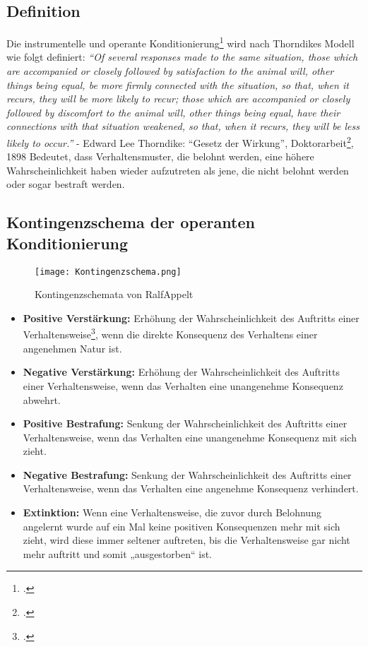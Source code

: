 \subsection{Definition}	
Die instrumentelle und operante Konditionierung\footcite{operant-conditioning2} wird nach Thorndikes Modell wie folgt definiert: 
\textit{“Of several responses made to the same situation, those which are accompanied or closely followed by satisfaction to the animal will, other things being equal, be more firmly connected with the situation, so that, when it recurs, they will be more likely to recur; those which are accompanied or closely followed by discomfort to the animal will, other things being equal, have their connections with that situation weakened, so that, when it recurs, they will be less likely to occur.”} 
- Edward Lee Thorndike: “Gesetz der Wirkung”, Doktorarbeit\footcite{operant-conditioning}, 1898 
Bedeutet, dass Verhaltensmuster, die belohnt werden, eine höhere Wahrscheinlichkeit haben wieder aufzutreten als jene, die nicht belohnt werden oder sogar bestraft werden. 
\subsection{Kontingenzschema der operanten Konditionierung}	
\begin{center}
\begin{figure}[h]
	\centering
 \texttt{[image: Kontingenzschema.png]}
	\caption{Kontingenzschemata von RalfAppelt}
\end{figure}
\end{center}
\newpage
\begin{itemize}
	\item \textbf{Positive Verstärkung:} Erhöhung der Wahrscheinlichkeit des Auftritts einer Verhaltensweise\footcite{operant-conditioning-bild}, wenn die direkte Konsequenz des Verhaltens einer angenehmen Natur ist. 
	\item \textbf{Negative Verstärkung:} Erhöhung der Wahrscheinlichkeit des Auftritts einer Verhaltensweise, wenn das Verhalten eine unangenehme Konsequenz abwehrt.
	\item \textbf{Positive Bestrafung:} Senkung der Wahrscheinlichkeit des Auftritts einer Verhaltensweise, wenn das Verhalten eine unangenehme Konsequenz mit sich zieht.
	\item \textbf{Negative Bestrafung:} Senkung der Wahrscheinlichkeit des Auftritts einer Verhaltensweise, wenn das Verhalten eine angenehme Konsequenz verhindert. 
	\item \textbf{Extinktion:} Wenn eine Verhaltensweise, die zuvor durch Belohnung angelernt wurde auf ein Mal keine positiven Konsequenzen mehr mit sich zieht, wird diese immer seltener auftreten, bis die Verhaltensweise gar nicht mehr auftritt und somit „ausgestorben“ ist. 
\end{itemize}

